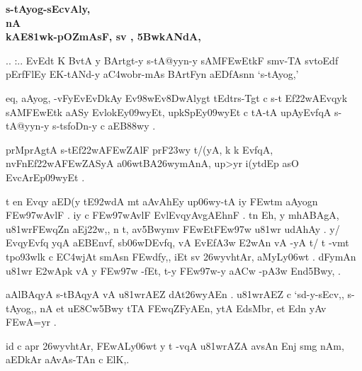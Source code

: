 \vfill

{\dn
\begin{center}
{\Large\bfseries{\dn s\2-tAyog{\rs -\re}sEcvAly,}}\\
{\Large\bfseries{\dn {}nA {\dn\dnnum {}}}}\\
{\large\bfseries{\dn kAE\381w\0k{\rs -\re}pOZ\0mAsF{\rs ,\re} s\2v {\dn\dnnum {}}{\rs ,\re} \35BwkANdA, {\dn\dnnum {}}}}
\end{center}
}

\newpage


{\dn .. :.. EvEdt\2 K BvtA\2 y BArtgt-y s\2-tA@yyn-y sAM\3FEwEtkF{\qva} smv-TA\2 sv\0toEdf\2 pErfFlEy\2 \dn\dnnum {} EK-tANd-y a\3C4wobr{\rs -\re}mAs\? BArtFy\?n aEDfAsn\?n {\rs `\re}s\2-tAyog,{\rs '\re}}

{\dn eq, aAyog, -vFyEvEvDkAy\?{\qvb} Ev\398wEv\38DwAlygt\2 tEdtr\-s\2-Tgt\2 c s\2-t\- Ef\322wAEvqyk\2 sAM\3FEwEtk aASy\2 EvlokEy\309wyEt{\rs ,\re} upkSpEy\309wyEt c tA\2-tA upAyEvf\?qA s\2-tA@yyn-y s\2-ts\2foDn-y c aEB\388wy\? .}

{\dn prMprAgtA\2 s\2-tEf\322wA\3FEwZAlF{\qva} prF\323wy t/(yA, k\? k\? Evf\?qA, nvFnEf\322wA\-\3FEwZASyA a\306wtBA\0\326wymAnA, up>y\?r i(y\?tdEp asO EvcArEp\309wyEt .}

{\dn t en\2 Evqy aED(y tE\392wdA\2 mt aAvAhEy up\306wy-tA iy\2 \3FEwt\?m aAyog\?n \3FEw\397wAvlF . iy\2 c \3FEw\397wAvlF EvlEvqyAvgAEhnF . t\?n Eh{\rs ,\re} y\? mhABAgA, u\381wr\3FEw\?qZ\?n aEj\322w\?,{\rs ,\re} n t\4, av\35Bwym\?v \3FEwEt\3FEw\397w u\381wr udAhAy\0 . y/ EvqyEvf\?q\? y\?qA aEBEnv\?f, s\2b\306wDEvf\?q, vA EvEf\3A3w\2 \3E2wAn\2 vA -yA t/ t\? -vmt\2 tpo\393wlk\2 c E\3C4wjAt\2 smAs\?n \3FEwdf\0y\?,{\rs ,\re} iEt sv\?{\qvb} \326wyvhtA\0r,  aMyLy\0\306wt\? . dFymAn u\381wr\2 \3E2wApk\2 vA y\2 \3FEw\397w\2 -fEt{\rs ,\re} t-y \3FEw\397w-y a\3ACw -p\3A3w\2 End\?{\qvb}\35Bwy, . }

{\dn aAlBAqyA s\2-tBAqyA vA u\381wrAEZ dAt\326wyAEn . u\381wrAEZ c {\rs `\re}sd-y{\rs -\re}sEcv,{\rs ,\re} s\2-tAyog,{\rs ,\re} nA \dn\dnnum {} et uE\38Cw\35Bwy tTA \3FEw\?qZFyAEn{\rs ,\re} ytA  EdsMbr{\rs ,\re}  et Edn\2 yAv \3FEwA=y\?r .}

{\dn  id\2 c apr\2 \326wyvhtA\0r, \3FEwALy\0\306wt\?{\rs ,\re} y t\? -v\?qA u\381wrAZA avsAn\? Enj\2 smg\5\2 nAm{\rs ,\re} aEDkAr aAvAs-TAn\2 c ElK\?,\1.}


